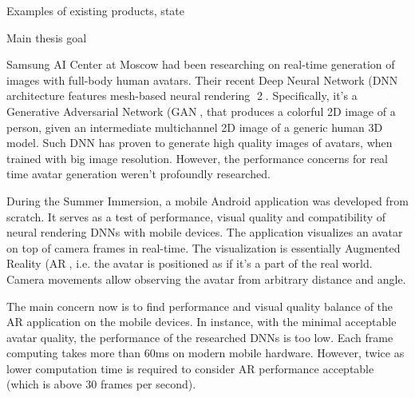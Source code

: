  Examples of existing products, state
 
 Main thesis goal
 
 Samsung AI Center at Moscow had been researching on real-time generation of images
 with full-body human avatars. Their recent Deep Neural Network (DNN architecture
 features mesh-based neural rendering 2. Specifically, it's a Generative Adversarial
 Network (GAN, that produces a colorful 2D image of a person, given an intermediate
 multichannel 2D image of a generic human 3D model. Such DNN has proven to generate
 high quality images of avatars, when trained with big image resolution. However, the
 performance concerns for real time avatar generation weren't profoundly researched.
 
 During the Summer Immersion, a mobile Android application was developed from
 scratch. It serves as a test of performance, visual quality and compatibility of neural
 rendering DNNs with mobile devices. The application visualizes an avatar on top of
 camera frames in real-time. The visualization is essentially Augmented Reality (AR, i.e.
 the avatar is positioned as if it's a part of the real world. Camera movements allow
 observing the avatar from arbitrary distance and angle.
 
 The main concern now is to find performance and visual quality balance of the AR
 application on the mobile devices. In instance, with the minimal acceptable avatar
 quality, the performance of the researched DNNs is too low. Each frame computing
 takes more than 60ms on modern mobile hardware. However, twice as lower
 computation time is required to consider AR performance acceptable (which is above 30
 frames per second).

